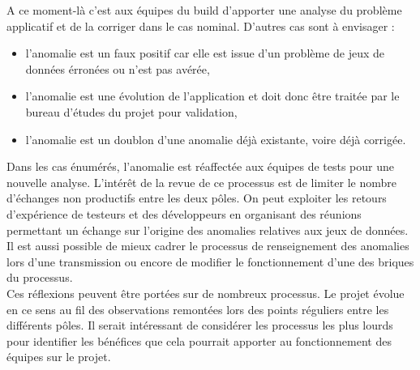 \documentclass[12pt,a4paper]{article}
\begin{document}
A ce moment-là c'est aux équipes du build d'apporter une analyse du problème applicatif et de la corriger dans le cas nominal.
\smallbreak
D'autres cas sont à envisager :
\smallbreak
\begin{itemize}
\item l'anomalie est un faux positif car elle est issue d'un problème de jeux de données érronées ou n'est pas avérée,
\item l'anomalie est une évolution de l'application et doit donc être traitée par le bureau d'études du projet pour validation,
\item l'anomalie est un doublon d'une anomalie déjà existante, voire déjà corrigée.
\end{itemize} 
\medbreak
Dans les cas énumérés, l'anomalie est réaffectée aux équipes de tests pour une nouvelle analyse. L'intérêt de la revue de ce processus est de limiter le nombre d'échanges non productifs entre les deux pôles. On peut exploiter les retours d'expérience de testeurs et des développeurs en organisant des réunions permettant un échange sur l'origine des anomalies relatives aux jeux de données. Il est aussi possible de mieux cadrer le processus de renseignement des anomalies lors d'une transmission ou encore de modifier le fonctionnement d'une des briques du processus.\\
Ces réflexions peuvent être portées sur de nombreux processus. Le projet évolue en ce sens au fil des observations remontées lors des points réguliers entre les différents pôles. Il serait intéressant de considérer les processus les plus lourds pour identifier les bénéfices que cela pourrait apporter au fonctionnement des équipes sur le projet.

\clearpage
\newpage
\end{document}
